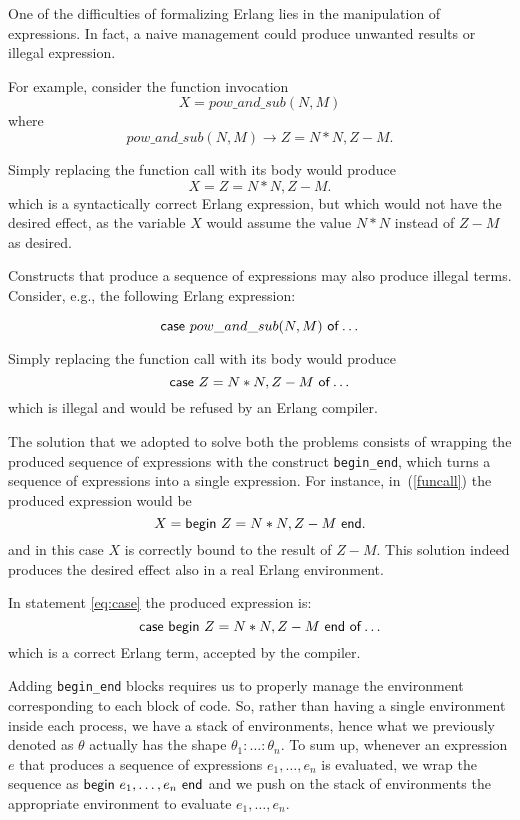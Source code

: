 \documentclass{article}[12pt,a4paper]
\theoremstyle{definition}
\begin{document}
One of the difficulties of formalizing Erlang lies in the manipulation of
expressions. In fact, a naive management could produce unwanted results or illegal
expression.

For example, consider the function invocation
\begin{equation}\label{funcall}
  X=pow\_and\_sub(N,M) 
\end{equation}
where
\[
  pow\_and\_sub(N,M) \rightarrow Z = N*N, Z-M.
\]

Simply replacing the function call with its body would produce
\[
  X = Z = N*N, Z-M.
\]
which is a syntactically correct Erlang expression, but which would not have the desired effect, as the variable $X$ would assume the
value $N*N$ instead of $Z-M$ as desired.

Constructs that produce a sequence of expressions
may also produce illegal terms. Consider, e.g., the
following Erlang expression:

\begin{equation}\label{eq:case}
  \mathsf{case}~pow\_and\_sub(N,M)~\mathsf{of} \ldots
\end{equation}

Simply replacing the function call with its body would produce 
\[
  \mathsf{case}~Z = N*N, Z-M~\mathsf{of} \ldots
\]
which is illegal and would be refused by an Erlang compiler.

The solution that we adopted to solve both the problems consists of wrapping the produced sequence of
expressions with the construct \verb+begin_end+, which turns a sequence of expressions into a single expression. For instance, in~(\ref{funcall}) the produced expression
would be 
\[
  X = \mathsf{begin}~Z = N*N, Z-M~\mathsf{end}.
\]
and in this case $X$ is correctly bound to the result of $Z-M$. This solution indeed
produces the desired effect also in a real Erlang environment.

In statement \ref{eq:case} the produced expression is:
\[
  \mathsf{case}~\mathsf{begin}~Z = N*N, Z-M~\mathsf{end}~\mathsf{of} \ldots
\]
which is a correct Erlang term, accepted by the compiler. 

Adding \verb+begin_end+ blocks
requires us to properly manage the environment
corresponding to each block of code. So, rather than having a single
environment inside each process, we have a stack of environments, hence what we previously denoted as $\theta$ actually has the
shape $\theta_1:\ldots:\theta_n$. To sum up, whenever an expression $e$ that produces a sequence of expressions $e_1,\ldots,e_n$ is evaluated, we wrap
the sequence as $\mathsf{begin}~e_1,\ldots,e_n~\mathsf{end}$ and we push on the stack
of environments the appropriate environment to evaluate $e_1,\ldots,e_n$. 
\end{document}
